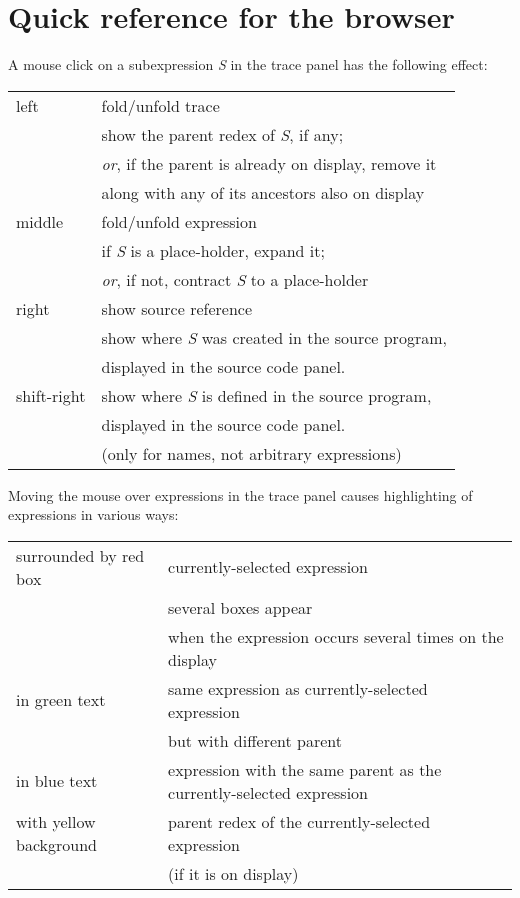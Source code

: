 \documentclass[12pt]{article}
\begin{document}

\newpage
\section{Quick reference for the browser}


A mouse click on a subexpression \emph{S} in the trace panel has the following effect:

\begin{center}
\begin{tabular}{ll}
left &
fold/unfold trace\\
&\quad show the parent redex of \emph{S}, if any;\\
&\quad \emph{or}, if the parent is already on
display, remove it\\ 
&\quad along with any of its
ancestors also on display
\\
middle &
fold/unfold expression\\
&\quad if \emph{S} is a place-holder, expand it;\\
&\quad \emph{or}, if not, contract \emph{S} to a
place-holder
\\
right &
show source reference\\
&\quad show where \emph{S} was created in the
source program,\\
&\quad displayed in the source code panel.
\\
shift-right &
\quad show where \emph{S} is defined in the source program,\\ 
&\quad displayed in the source code panel.\\
&\quad (only for names, not arbitrary expressions)
\end{tabular}
\end{center}

\noindent
Moving the mouse over expressions in the trace panel causes highlighting of expressions in various ways:

\begin{center}
\begin{tabular}{ll}
surrounded by red box & currently-selected expression \\
& several boxes appear\\
& when the expression occurs several times on the display \\
in green text & same expression as currently-selected expression \\
& but with different parent \\
in blue text & expression with the same parent as the currently-selected expression \\
with yellow background & parent redex of the currently-selected expression\\
& (if it is on display)
\end{tabular}
\end{center}
\end{document}
